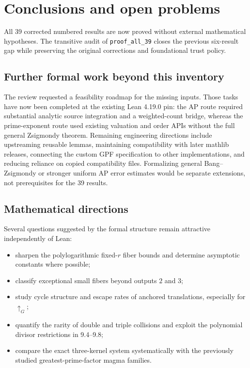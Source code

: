 \documentclass[11pt,a4paper,oneside,open=any,headings=small]{scrbook}
\theoremstyle{definition}
\newcommand{\gexp}{\mathbin{\uparrow_{G}}}
\newcommand{\lean}[1]{\ifmmode\text{\texttt{\detokenize{#1}}}\else\nolinkurl{#1}\fi}
\begin{document}
\chapter{Conclusions and open problems}\label{ch:conclusions}

All 39 corrected numbered results are now proved without external mathematical hypotheses. The transitive audit of \lean{proof_all_39} closes the previous six-result gap while preserving the original corrections and foundational trust policy.

\section{Further formal work beyond this inventory}
The review requested a feasibility roadmap for the missing inputs. Those tasks have now been completed at the existing Lean 4.19.0 pin: the AP route required substantial analytic source integration and a weighted-count bridge, whereas the prime-exponent route used existing valuation and order APIs without the full general Zsigmondy theorem. Remaining engineering directions include upstreaming reusable lemmas, maintaining compatibility with later mathlib releases, connecting the custom GPF specification to other implementations, and reducing reliance on copied compatibility files. Formalizing general Bang--Zsigmondy or stronger uniform AP error estimates would be separate extensions, not prerequisites for the 39 results.

\section{Mathematical directions}
Several questions suggested by the formal structure remain attractive independently of Lean:
\begin{itemize}
\item sharpen the polylogarithmic fixed-$r$ fiber bounds and determine asymptotic constants where possible;
\item classify exceptional small fibers beyond outputs $2$ and $3$;
\item study cycle structure and escape rates of anchored translations, especially for $\gexp$;
\item quantify the rarity of double and triple collisions and exploit the polynomial divisor restrictions in 9.4--9.8;
\item compare the exact three-kernel system systematically with the previously studied greatest-prime-factor magma families.
\end{itemize}
\end{document}
